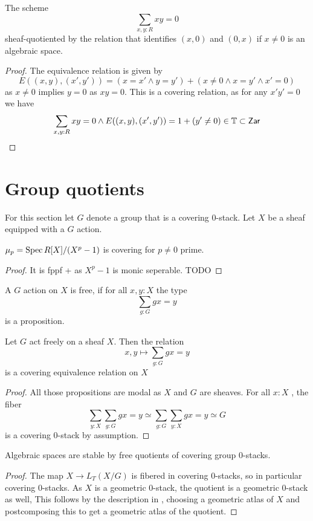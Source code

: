 \begin{example}
	The scheme 
	\[
	\sum_{x , y : R} x y = 0
	\]
	sheaf-quotiented by the relation that identifies $(x,0)$ and $(0,x)$ if $x \neq 0$ is an algebraic space.
\end{example}
\begin{proof}
	The equivalence relation is given by
	\[
	E((x,y) , (x',y')) = (x = x' \land y = y') + (x \neq 0 \land x = y' \land x' = 0)
	\]
	as $x \neq 0$ implies $y = 0$ as $x y =0$. This is a covering relation, as for any $x' y' = 0$ we have
	\[
	\sum_{x,y : R} x y = 0 \land E((x,y) , (x' , y')) = 1 + (y' \neq 0) \in \mathbb{T} \subset \mathsf{Zar}
	\]		
\end{proof}



\section{Group quotients}
For this section let $G$ denote a group that is a covering 0-stack. Let $X$ be a sheaf equipped with a $G$ action.
\begin{lemma}
	 $\mu_p = \operatorname{Spec} R[X] / (X^p - 1)$ is covering for $p \neq 0$ prime.
\end{lemma}
\begin{proof}
	It is fppf + \etale as $X^p - 1$ is monic seperable. TODO
\end{proof}
\begin{definition}
	A $G$ action on $X$ is free, if for all $x , y : X$ the type 
	\[
	\sum_{g: G} g x = y
	\]
	is a proposition. 
\end{definition}
\begin{lemma}
	Let $G$ act freely on a sheaf $X$. Then the relation
	\[
	x , y\mapsto \sum_{g : G} g x = y
	\]
	is a covering equivalence relation on $X$
\end{lemma}
\begin{proof}
	All those propositions are modal as $X$ and $G$ are sheaves. For all $x : X$ , the fiber
	\[
	\sum_{y : X} \sum_{g : G} g x = y \simeq \sum_{g : G} \sum_{y: X} g x = y \simeq G
	\]
	is a covering 0-stack by assumption.
\end{proof}
\begin{lemma}{\label{lemma:algSpacesStabFreeQuots}}
	Algebraic spaces are stable by free quotients of covering group 0-stacks.
\end{lemma}
\begin{proof}
	The map $ X \to L_T (X / G)$ is fibered in covering 0-stacks, so in particular covering $0$-stacks. As $X$ is a geometric $0$-stack, the quotient is a geometric $0$-stack as well, This follows by the description in \label{prop:nstack}, choosing a geometric atlas of $X$ and postcomposing this to get a geometric atlas of the quotient.
\end{proof}

